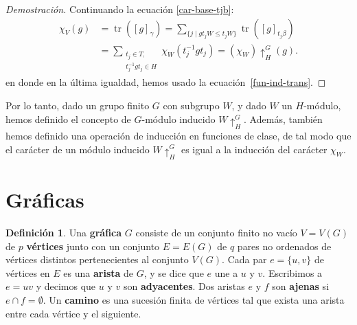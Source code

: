 \documentclass[12pt]{book}
\theoremstyle{definition}
\newtheorem{definition}[theorem]{Definición}
\DeclareMathOperator{\tr}{tr}
\newcounter{in}
\newcounter{ini}
\begin{document}
\begin{proof}[Demostración]
  Continuando la ecuación \ref{car-base-tjb}:
  \begin{align*}
    \chi_{V}(g)&=\tr([g]_{\gamma})=\sum_{\{j\mid gt_{j}W\leq t_{j}W\}}\tr([g]_{t_{j}\beta})\\
    &=\sum_{\substack{t_{j}\in T,\\t^{-1}_{j}gt_{j}\in H}}\chi_{W}(t^{-1}_{j}gt_{j})=(\chi_{W})\uparrow^{G}_{H}(g).
  \end{align*}
  en donde en la última igualdad, hemos usado la ecuación~\ref{fun-ind-trans}.
\end{proof}

Por lo tanto, dado un grupo finito $G$ con subgrupo $W$, y dado $W$ un
$H$-módulo, hemos definido el concepto de $G$-módulo inducido $W\uparrow^{G}_{H}$. Además,
también hemos definido una operación de inducción en funciones de clase, de tal
modo que el carácter de un módulo inducido $W\uparrow^{G}_{H}$ es
igual a la inducción del carácter $\chi_{W}$.

\section{Gráficas}
\label{graficas}

\begin{definition}
  Una \textbf{gráfica} $G$ consiste de un conjunto finito no vacío $V=V(G)$
  de $p$ \textbf{vértices} junto con un conjunto $E=E(G)$ de $q$ pares no
  ordenados de vértices distintos pertenecientes al conjunto $V(G)$. Cada par $e=\{u,v\}$ de vértices
  en $E$ es una \textbf{arista} de $G$, y se dice que $e$ une a $u$ y
  $v$. Escribimos a $e=uv$ y decimos que $u$ y $v$ son \textbf{adyacentes}.
  Dos aristas $e$ y $f$ son \textbf{ajenas} si $e\cap f=\emptyset$. Un
  \textbf{camino} es una sucesión finita de
  vértices tal que exista una arista entre cada vértice y el siguiente.
\end{definition}
\end{document}
